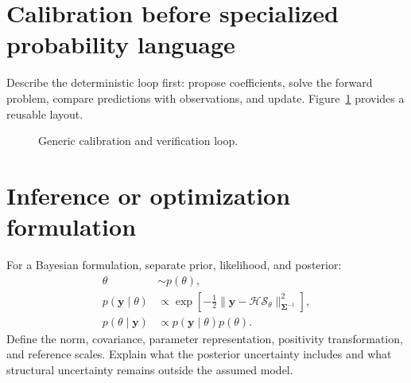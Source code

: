 \documentclass[11pt]{article}
\newcommand{\vect}[1]{\bm{#1}}
\begin{document}
\section{Calibration before specialized probability language}

Describe the deterministic loop first: propose coefficients, solve the forward problem, compare predictions with observations, and update. Figure~\ref{fig:calibration} provides a reusable layout.

\begin{figure}[htbp]
\centering
{}
\caption{Generic calibration and verification loop.}
\label{fig:calibration}
\end{figure}

\section{Inference or optimization formulation}

For a Bayesian formulation, separate prior, likelihood, and posterior:
\begin{align}
 \theta&\sim p(\theta),\\
 p(\vect y\mid\theta)&\propto
 \exp\!\left[-\tfrac12
 \|\vect y-\mathcal H\mathcal S_\theta\|_{\vect\Sigma^{-1}}^2\right],\\
 p(\theta\mid\vect y)&\propto p(\vect y\mid\theta)p(\theta).
 \label{eq:posterior}
\end{align}
Define the norm, covariance, parameter representation, positivity transformation, and reference scales. Explain what the posterior uncertainty includes and what structural uncertainty remains outside the assumed model.
\end{document}
